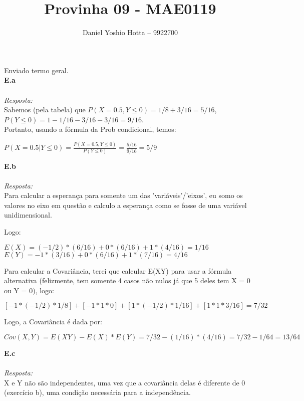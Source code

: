 \documentclass{article}
\begin{document}
	
	\title{Provinha 09 - MAE0119}
	\author{Daniel Yoshio Hotta – 9922700}
	
	\maketitle	
	
	Enviado termo geral.\\
	
	\textbf {E.a} 
	\\ \\
	\textit {Resposta:} \\
    
    Sabemos (pela tabela) que $P(X = 0.5, Y \leq 0) = 1/8 + 3/16 = 5/16$, $P(Y \leq 0) = 1 - 1/16 - 3/16 - 3/16 = 9/16$. \\
    
    Portanto, usando a fórmula da Prob condicional, temos:
    
    \begin{center}
    	$P(X = 0.5 | Y \leq 0) = \frac{P(X = 0.5, Y \leq 0)}{P(Y \leq 0)} = \frac{5/16}{9/16} = 5/9$
    \end{center}

    \textbf {E.b} 
    \\ \\
    \textit {Resposta:} \\
    
    Para calcular a esperança para somente um das 'variáveis'/'eixos', eu somo os valores no eixo em questão e calculo a esperança como se fosse de uma variável unidimensional.
    
    Logo:
    
    \begin{center}
    	$E(X) = (-1/2) * (6/16) + 0 * (6/16) + 1 * (4/16) = 1/16$\\
    	$E(Y) = -1 * (3/16) + 0 * (6/16) + 1 * (7/16) = 4/16$\\    	
    \end{center}
    
    Para calcular a Covariância, terei que calcular E(XY) para usar a fórmula alternativa (felizmente, tem somente 4 casos não nulos já que 5 deles tem X = 0 ou Y = 0), logo:
    
    \begin{center}
    	$[-1 * (-1/2) * 1/8] + [-1 * 1 * 0] + [1 * (-1/2) * 1/16] + [1 * 1 * 3/16] = 7/32$ 
    \end{center}

    Logo, a Covariância é dada por:
    
    \begin{center}
    	$Cov(X, Y) = E(XY) - E(X) * E(Y) = 7/32 - (1/16)*(4/16) = 7/32 - 1/64 = 13/64$
    \end{center}

    \textbf {E.c} 
    \\ \\
    \textit {Resposta:} \\
    
    X e Y não são independentes, uma vez que a covariância delas é diferente de 0 (exercício b), uma condição necessária para a independência.
\end{document}
